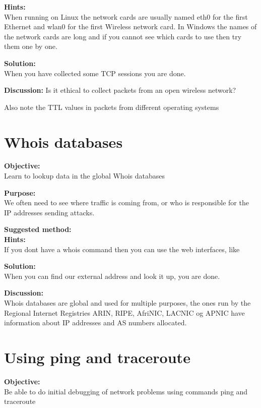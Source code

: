 \documentclass[a4paper,11pt,notitlepage]{report}
\begin{document}
{\bf Hints:}\\
When running on Linux the network cards are usually named eth0 for the first Ethernet and wlan0 for the first Wireless network card. In Windows the names of the network cards are long and if you cannot see which cards to use then try them one by one.

{\bf Solution:}\\
When you have collected some TCP sessions you are done.

{\bf Discussion:}
Is it ethical to collect packets from an open wireless network?

Also note the TTL values in packets from different operating systems

\chapter{Whois databases}
\label{ex:whois}

{\bf Objective:}\\
Learn to lookup data in the global Whois databases

{\bf Purpose:}\\
We often need to see where traffic is coming from, or who is responsible for the IP addresses sending attacks.

{\bf Suggested method:}\\

{\bf Hints:}\\
If you dont have a whois command then you can use the web interfaces, like 

{\bf Solution:}\\
When you can find our external address and look it up, you are done.

{\bf Discussion:}\\
Whois databases are global and used for multiple purposes, the ones run by the Regional Internet Registries ARIN, RIPE, AfriNIC, LACNIC og APNIC have information about IP addresses and AS numbers allocated.

\chapter{Using ping and traceroute}
\label{ex:ping}



{\bf Objective:}\\
Be able to do initial debugging of network problems using commands ping and traceroute
\end{document}
